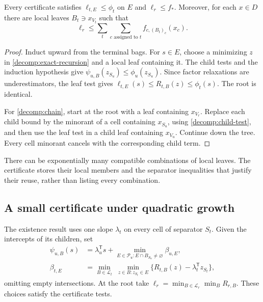 \begin{lemma}\label{decomp:validity}
Every certificate satisfies $\ell_{t,E}\le\phi_t$ on $E$ and
$\ell_r\le f_*$. Moreover, for each $x\in D$ there are local leaves
$B_t\ni x_{V_t}$ such that
\begin{equation}\label{decomp:chain}
 \ell_r\le\sum_t\sum_{c\text{ assigned to }t}f_{c,(B_t)_c}(x_c).
\end{equation}
\end{lemma}
\begin{proof}
Induct upward from the terminal bags. For $s\in E$, choose a minimizing
$z$ in \eqref{decomp:exact-recursion} and a local leaf containing it.
The child tests and the induction hypothesis give
$\psi_{u,B}(z_{S_u})\le\phi_u(z_{S_u})$. Since factor relaxations are
underestimators, the leaf test gives
$\ell_{t,E}(s)\le R_{t,B}(z)\le\phi_t(s)$. The root is identical.

For \eqref{decomp:chain}, start at the root with a leaf containing
$x_{V_r}$. Replace each child bound by the minorant of a cell containing
$x_{S_u}$, using \eqref{decomp:child-test}, and then use the leaf test in a
child leaf containing $x_{V_u}$. Continue down the tree. Every cell
minorant cancels with the corresponding child term.
\end{proof}

There can be exponentially many compatible combinations of local leaves.
The certificate stores their local members and the separator inequalities
that justify their reuse, rather than listing every combination.

\subsection{A small certificate under quadratic growth}

The existence result uses one slope $\lambda_t$ on every cell of separator
$S_t$. Given the intercepts of its children, set
\begin{align}
 \psi_{u,B}(s)&=\lambda_u^{\mathsf T}s+
       \min_{E\in\mathcal P_u:E\cap B_{S_u}\ne\varnothing}\beta_{u,E},
       \label{decomp:common-slope-child}\\
 \beta_{t,E}&=\min_{B\in\mathcal L_t}\;
       \min_{z\in B:z_{S_t}\in E}
       \{R_{t,B}(z)-\lambda_t^{\mathsf T}z_{S_t}\},
       \label{decomp:intercepts}
\end{align}
omitting empty intersections. At the root take
$\ell_r=\min_{B\in\mathcal L_r}\min_B R_{r,B}$.
These choices satisfy the certificate tests.

